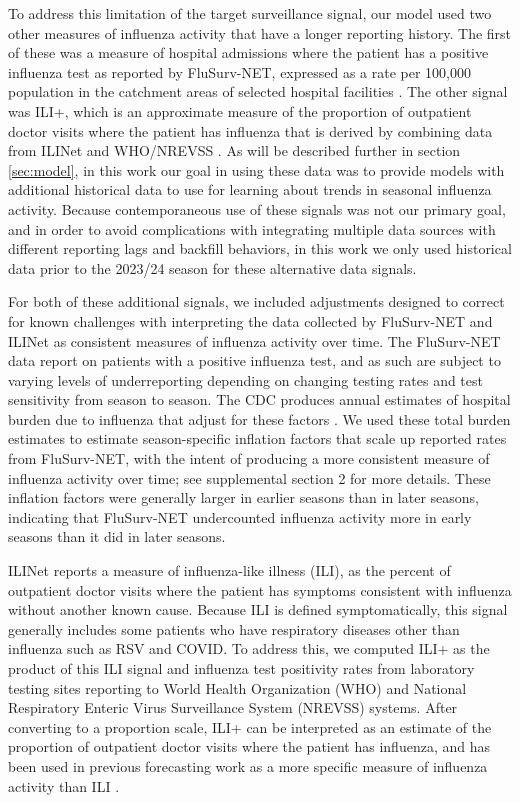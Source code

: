\documentclass{article}\usepackage[]{graphicx}\usepackage[]{xcolor}
\begin{document}
To address this limitation of the target surveillance signal, our model used two other measures of influenza activity that have a longer reporting history. The first of these was a measure of hospital admissions where the patient has a positive influenza test as reported by FluSurv-NET, expressed as a rate per 100,000 population in the catchment areas of selected hospital facilities \cite{cdc_flusurvnet}.
The other signal was ILI+, which is an approximate measure of the proportion of outpatient doctor visits where the patient has influenza that is derived by combining data from ILINet and WHO/NREVSS \cite{goldstein2011-predicting-epidemic-sizes-flu-strains,cdc_flusurveillance_overview}.
As will be described further in section \ref{sec:model}, in this work our goal in using these data was to provide models with additional historical data to use for learning about trends in seasonal influenza activity. Because contemporaneous use of these signals was not our primary goal, and in order to avoid complications with integrating multiple data sources with different reporting lags and backfill behaviors, in this work we only used historical data prior to the 2023/24 season for these alternative data signals.

For both of these additional signals, we included adjustments designed to correct for known challenges with interpreting the data collected by FluSurv-NET and ILINet as consistent measures of influenza activity over time.  The FluSurv-NET data report on patients with a positive influenza test, and as such are subject to varying levels of underreporting depending on changing testing rates and test sensitivity from season to season.  The CDC produces annual estimates of hospital burden due to influenza that adjust for these factors \cite{cdc_flu_burden}.  We used these total burden estimates to estimate season-specific inflation factors that scale up reported rates from FluSurv-NET, with the intent of producing a more consistent measure of influenza activity over time; see supplemental section 2 for more details.  These inflation factors were generally larger in earlier seasons than in later seasons, indicating that FluSurv-NET undercounted influenza activity more in early seasons than it did in later seasons.

ILINet reports a measure of influenza-like illness (ILI), as the percent of outpatient doctor visits where the patient has symptoms consistent with influenza without another known cause. Because ILI is defined symptomatically, this signal generally includes some patients who have respiratory diseases other than influenza such as RSV and COVID. To address this, we computed ILI+ as the product of this ILI signal and influenza test positivity rates from laboratory testing sites reporting to World Health Organization (WHO) and National Respiratory Enteric Virus Surveillance System (NREVSS) systems.  After converting to a proportion scale, ILI+ can be interpreted as an estimate of the proportion of outpatient doctor visits where the patient has influenza, and has been used in previous forecasting work as a more specific measure of influenza activity than ILI \cite[e.g.][]{goldstein2011-predicting-epidemic-sizes-flu-strains,shaman2013-influenza-forecast-2012-2013}.
\end{document}
